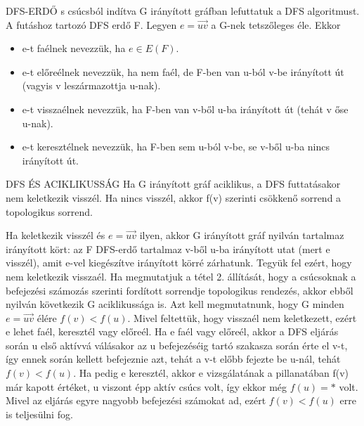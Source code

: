 \begin{definicio}{DFS-ERDŐ}
s csúcsból indítva G irányított gráfban lefuttatuk a DFS algoritmust. A futáshoz tartozó DFS erdő F. Legyen $e=\overrightarrow{uv}$ a G-nek tetszőleges éle. Ekkor
\begin{itemize}
\item e-t faélnek nevezzük, ha $e \in E(F)$.
\item e-t előreélnek nevezzük, ha nem faél, de F-ben van u-ból v-be irányított út (vagyis v leszármazottja u-nak).
\item e-t visszaélnek nevezzük, ha F-ben van v-ből u-ba irányított út (tehát v őse u-nak).
\item e-t keresztélnek nevezzük, ha F-ben sem u-ból v-be, se v-ből u-ba nincs irányított út.
\end{itemize}
\end{definicio}

\begin{tetel}{DFS ÉS ACIKLIKUSSÁG}
Ha G irányított gráf aciklikus, a DFS futtatásakor nem keletkezik visszél. Ha nincs visszél, akkor f(v) szerinti csökkenő sorrend a topologikus sorrend.
\end{tetel}

\begin{bizonyitas}{}
Ha keletkezik visszél és $e = \overrightarrow{uv}$ ilyen, akkor G irányított gráf nyilván tartalmaz irányított kört: az F DFS-erdő tartalmaz v-ből u-ba irányított utat (mert e visszél), amit e-vel kiegészítve irányított körré zárhatunk. Tegyük fel ezért, hogy nem keletkezik visszaél. Ha megmutatjuk a tétel 2. állítását, hogy a csúcsoknak a befejezési számozás szerinti fordított sorrendje topologikus rendezés, akkor ebből nyilván következik G aciklikussága is. Azt kell megmutatnunk, hogy G minden $e = \overrightarrow{uv}$ élére $f(v) < f(u)$. Mivel feltettük, hogy visszaél nem keletkezett, ezért e lehet faél, keresztél vagy előreél. Ha e faél vagy előreél, akkor a DFS eljárás során u első aktívvá válásakor az u befejezéséig tartó szakasza során érte el v-t, így ennek során kellett befejeznie azt, tehát a v-t előbb fejezte be u-nál, tehát $f(v) < f(u)$. Ha pedig e keresztél, akkor e vizsgálatának a pillanatában f(v) már kapott értéket, u viszont épp aktív csúcs volt, így ekkor még $f(u) = *$ volt. Mivel az eljárás egyre nagyobb befejezési számokat ad, ezért $f(v) < f(u)$ erre is teljesülni fog.
\end{bizonyitas}
